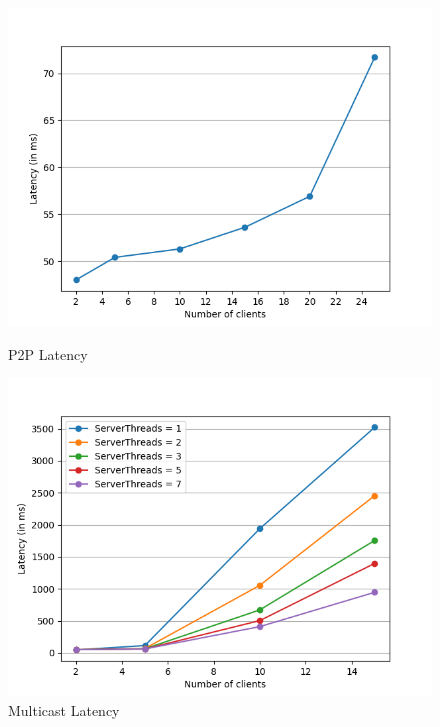 \documentclass[a4paper,10pt]{article}
\begin{document}
\begin{figure}[!h]
    \hspace{-1.7cm}
    \begin{minipage}[t]{8cm}
	    \centering
		\includegraphics[scale=0.38]{P2P_t1}
		\caption{P2P Latency}
		\label{fig:Diagram3}
	\end{minipage}
	\hspace{-1.5cm}
	\begin{minipage}[t]{10cm}
	    \centering
		\includegraphics[scale=0.38]{Room_tAll}
		\caption{Multicast Latency}
		\label{fig:Diagram4}
	\end{minipage}
\end{figure}
\end{document}
